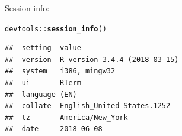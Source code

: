 \documentclass{article}\usepackage[]{graphicx}\usepackage[]{color}
\makeatletter
\newcommand{\hlopt}[1]{\textcolor[rgb]{0,0,0}{#1}}%
\newcommand{\hlstd}[1]{\textcolor[rgb]{0.345,0.345,0.345}{#1}}%
\newcommand{\hlkwd}[1]{\textcolor[rgb]{0.737,0.353,0.396}{\textbf{#1}}}%
\newenvironment{kframe}{%
 \def\at@end@of@kframe{}%
 \ifinner\ifhmode%
  \def\at@end@of@kframe{\end{minipage}}%
  \begin{minipage}{\columnwidth}%
 \fi\fi%
 \def\FrameCommand##1{\hskip\@totalleftmargin \hskip-\fboxsep
 \colorbox{shadecolor}{##1}\hskip-\fboxsep
     \hskip-\linewidth \hskip-\@totalleftmargin \hskip\columnwidth}%
 \MakeFramed {\advance\hsize-\width
   \@totalleftmargin\z@ \linewidth\hsize
   \@setminipage}}%
 {\par\unskip\endMakeFramed%
 \at@end@of@kframe}
\newenvironment{knitrout}{}{} %
\makeatother
\begin{document}
Session info:
\begin{knitrout}
\color{fgcolor}\begin{kframe}
\begin{alltt}
\hlstd{devtools}\hlopt{::}\hlkwd{session_info}\hlstd{()}
\end{alltt}


{\ttfamily\noindent\itshape\color{messagecolor}{\#\# Session info ----------------------------------------------}}\begin{verbatim}
##  setting  value                       
##  version  R version 3.4.4 (2018-03-15)
##  system   i386, mingw32               
##  ui       RTerm                       
##  language (EN)                        
##  collate  English_United States.1252  
##  tz       America/New_York            
##  date     2018-06-08
\end{verbatim}



\end{kframe}
\end{knitrout}
\end{document}
